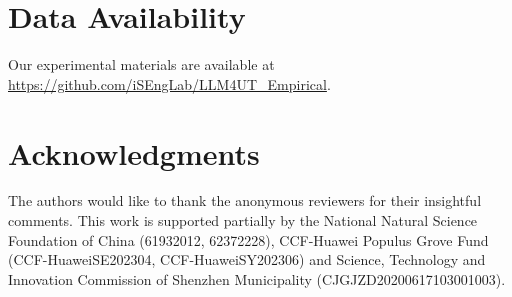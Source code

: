 \documentclass[acmsmall,screen]{acmart}
\begin{document}


\maketitle



















\section{Data Availability}
Our experimental materials are available at \url{https://github.com/iSEngLab/LLM4UT_Empirical}.

\section*{Acknowledgments}
The authors would like to thank the anonymous reviewers for their insightful comments.
This work is supported partially by the National Natural Science Foundation of China (61932012, 62372228), CCF-Huawei Populus Grove Fund (CCF-HuaweiSE202304, CCF-HuaweiSY202306) and Science, Technology and Innovation Commission of Shenzhen Municipality (CJGJZD20200617103001003).




\end{document}
